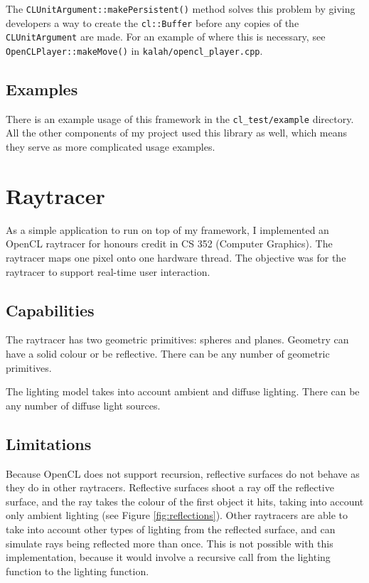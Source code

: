 \documentclass{article}
\begin{document}
The \texttt{CLUnitArgument::makePersistent()} method solves this problem by giving developers a way to create the \texttt{cl::Buffer} before any copies of the \texttt{CLUnitArgument} are made. For an example of where this is necessary, see \texttt{OpenCLPlayer::makeMove()} in \texttt{kalah/opencl\_player.cpp}.

\subsection{Examples}
There is an example usage of this framework in the \texttt{cl\_test/example} directory. All the other components of my project used this library as well, which means they serve as more complicated usage examples.

\section{Raytracer}
As a simple application to run on top of my framework, I implemented an OpenCL raytracer for honours credit in CS 352 (Computer Graphics). The raytracer maps one pixel onto one hardware thread. The objective was for the raytracer to support real-time user interaction.

\subsection{Capabilities}
The raytracer has two geometric primitives: spheres and planes. Geometry can have a solid colour or be reflective. There can be any number of geometric primitives.

The lighting model takes into account ambient and diffuse lighting. There can be any number of diffuse light sources.

\subsection{Limitations}
Because OpenCL does not support recursion, reflective surfaces do not behave as they do in other raytracers. Reflective surfaces shoot a ray off the reflective surface, and the ray takes the colour of the first object it hits, taking into account only ambient lighting (see Figure \ref{fig:reflections}). Other raytracers are able to take into account other types of lighting from the reflected surface, and can simulate rays being reflected more than once. This is not possible with this implementation, because it would involve a recursive call from the lighting function to the lighting function.
\end{document}
